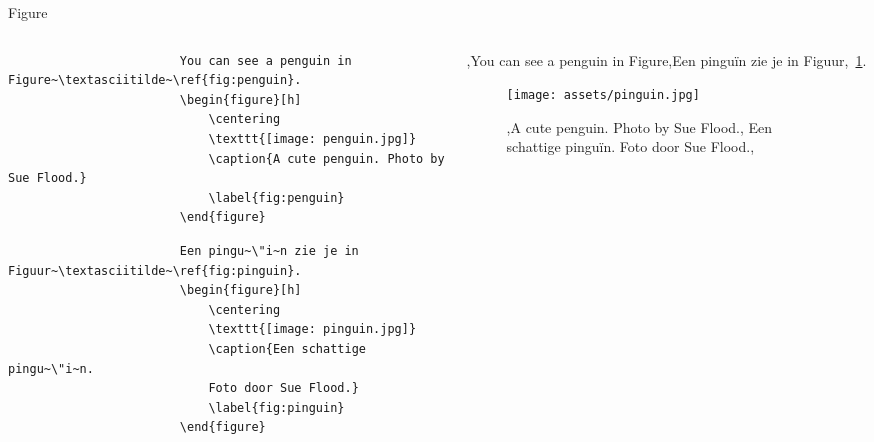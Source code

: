 \begin{frame}[fragile]{Figure}
    \begin{columns}
        \begin{column}{0.68\textwidth}
            \ifenglish
                \begin{codebox}
                    \begin{verbatim}
                        You can see a penguin in Figure~\textasciitilde~\ref{fig:penguin}.
                        \begin{figure}[h]
                            \centering
                            \texttt{[image: penguin.jpg]}
                            \caption{A cute penguin. Photo by Sue Flood.}
                            \label{fig:penguin}
                        \end{figure}
                    \end{verbatim}
                \end{codebox}
            \else
                \begin{codebox}
                    \begin{verbatim}
                        Een pingu~\"i~n zie je in Figuur~\textasciitilde~\ref{fig:pinguin}.
                        \begin{figure}[h]
                            \centering
                            \texttt{[image: pinguin.jpg]}
                            \caption{Een schattige pingu~\"i~n.
                            Foto door Sue Flood.}
                            \label{fig:pinguin}
                        \end{figure}
                    \end{verbatim}
                \end{codebox}
            \fi
        \end{column}
        \begin{column}{0.32\textwidth}
            \lang,You can see a penguin in Figure,Een pinguïn zie je in Figuur,~\ref{fig:pinguin}.
            \begin{figure}[h]
                \centering
                \texttt{[image: assets/pinguin.jpg]}
                \caption{\lang,A cute penguin. Photo by Sue Flood.,%
                Een schattige pinguïn. Foto door Sue Flood.,}\label{fig:pinguin}
            \end{figure}
        \end{column}
    \end{columns}
\end{frame}
